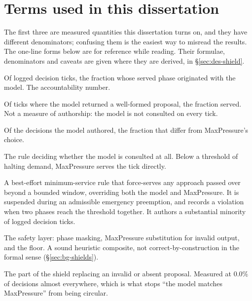 \chapter*{Terms used in this dissertation}

The first three are measured quantities this dissertation turns on, and they have
different denominators; confusing them is the easiest way to misread the results. The
one-line forms below are for reference while reading. Their formulae, denominators and
caveats are given where they are derived, in \S\ref{sec:des-shield}.

\begin{description}[leftmargin=0pt, itemsep=2pt]

\item[Authored share.] Of logged decision ticks, the fraction whose served phase
originated with the model. The accountability number.

\item[Proposal acceptance.] Of ticks where the model returned a well-formed proposal,
the fraction served. Not a measure of authorship: the model is not consulted on every
tick.

\item[Divergence rate.] Of the decisions the model authored, the fraction that differ
from MaxPressure's choice.

\item[Congestion gate.] The rule deciding whether the model is consulted at all. Below a
threshold of halting demand, MaxPressure serves the tick directly.

\item[Anti-starvation floor.] A best-effort minimum-service rule that force-serves any
approach passed over beyond a bounded window, overriding both the model and
MaxPressure. It is suspended during an admissible emergency preemption, and records a
violation when two phases reach the threshold together. It authors a substantial
minority of logged decision ticks.

\item[Shield.] The safety layer: phase masking, MaxPressure substitution for invalid
output, and the floor. A sound heuristic composite, not correct-by-construction in the
formal sense (\S\ref{sec:bg-shields}).

\item[Substitution path.] The part of the shield replacing an invalid or absent
proposal. Measured at $0.0\%$ of decisions almost everywhere, which is what stops
``the model matches MaxPressure'' from being circular.


\end{description}
